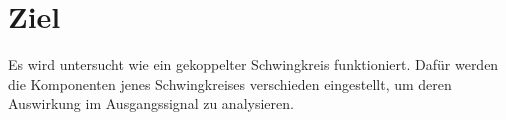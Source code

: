 \section{Ziel}
\label{sec:ziel}

Es wird untersucht wie ein gekoppelter Schwingkreis funktioniert.
Dafür werden die Komponenten jenes Schwingkreises verschieden eingestellt, um deren Auswirkung im Ausgangssignal zu analysieren.
